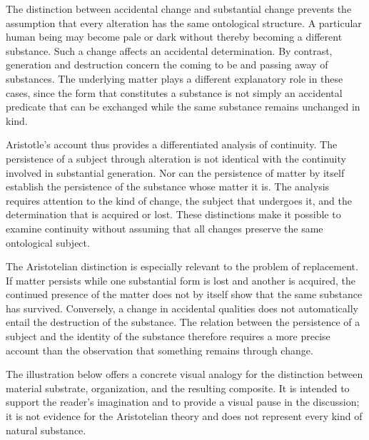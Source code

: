 \label{para:VS.B01.P01.C08.S05.SS08.P002}

The distinction between accidental change and
substantial change prevents the assumption that
every alteration has the same ontological structure.
A particular human being may become pale or dark
without thereby becoming a different substance.
Such a change affects an accidental determination.
By contrast, generation and destruction concern
the coming to be and passing away of substances.
The underlying matter plays a different explanatory
role in these cases, since the form that constitutes
a substance is not simply an accidental predicate
that can be exchanged while the same substance
remains unchanged in kind.

\label{para:VS.B01.P01.C08.S05.SS08.P003}

Aristotle's account thus provides a differentiated
analysis of continuity. The persistence of a subject
through alteration is not identical with the
continuity involved in substantial generation.
Nor can the persistence of matter by itself
establish the persistence of the substance whose
matter it is. The analysis requires attention
to the kind of change, the subject that undergoes
it, and the determination that is acquired or lost.
These distinctions make it possible to examine
continuity without assuming that all changes
preserve the same ontological subject.

\label{para:VS.B01.P01.C08.S05.SS08.P004}

The Aristotelian distinction is especially relevant
to the problem of replacement. If matter persists
while one substantial form is lost and another
is acquired, the continued presence of the matter
does not by itself show that the same substance
has survived. Conversely, a change in accidental
qualities does not automatically entail the
destruction of the substance. The relation between
the persistence of a subject and the identity
of the substance therefore requires a more
precise account than the observation that
something remains through change.

\label{para:VS.B01.P01.C08.S05.SS08.P005}

The illustration below offers a concrete visual
analogy for the distinction between material
substrate, organization, and the resulting
composite. It is intended to support the reader's
imagination and to provide a visual pause in
the discussion; it is not evidence for the
Aristotelian theory and does not represent every
kind of natural substance.

